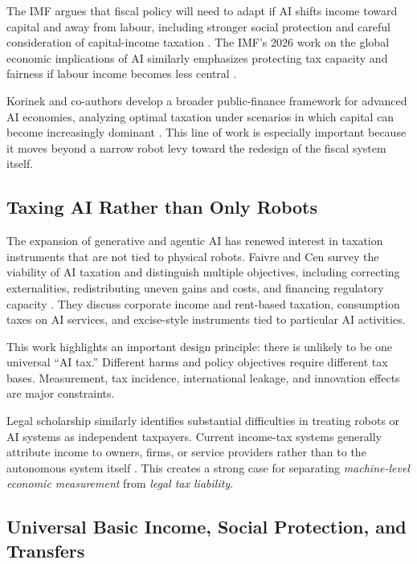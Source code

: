 \documentclass[conference]{IEEEtran}
\begin{document}
The IMF argues that fiscal policy will need to adapt if AI shifts income toward
capital and away from labour, including stronger social protection and careful
consideration of capital-income taxation \cite{IMF2024Fiscal}. The IMF's 2026
work on the global economic implications of AI similarly emphasizes protecting
tax capacity and fairness if labour income becomes less central
\cite{IMF2026GlobalAI}.

Korinek and co-authors develop a broader public-finance framework for advanced
AI economies, analyzing optimal taxation under scenarios in which capital can
become increasingly dominant \cite{Korinek2026}. This line of work is especially
important because it moves beyond a narrow robot levy toward the redesign of
the fiscal system itself.

\subsection{Taxing AI Rather than Only Robots}

The expansion of generative and agentic AI has renewed interest in taxation
instruments that are not tied to physical robots. Faivre and Cen survey the
viability of AI taxation and distinguish multiple objectives, including
correcting externalities, redistributing uneven gains and costs, and financing
regulatory capacity \cite{FaivreCen2026}. They discuss corporate income and
rent-based taxation, consumption taxes on AI services, and excise-style
instruments tied to particular AI activities.

This work highlights an important design principle: there is unlikely to be one
universal ``AI tax.'' Different harms and policy objectives require different
tax bases. Measurement, tax incidence, international leakage, and innovation
effects are major constraints.

Legal scholarship similarly identifies substantial difficulties in treating
robots or AI systems as independent taxpayers. Current income-tax systems
generally attribute income to owners, firms, or service providers rather than
to the autonomous system itself \cite{DimitropoulouAIIncome}. This creates a
strong case for separating \textit{machine-level economic measurement} from
\textit{legal tax liability}.

\subsection{Universal Basic Income, Social Protection, and Transfers}
\end{document}
